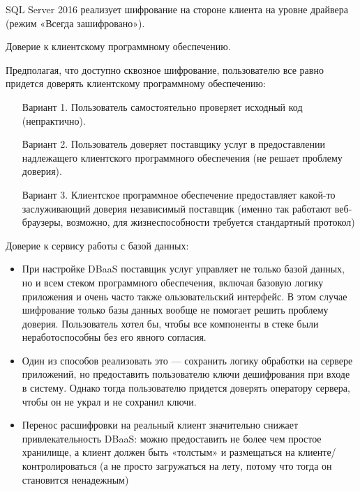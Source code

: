 SQL Server 2016 реализует шифрование на стороне клиента на уровне драйвера (режим «Всегда
зашифровано»).

Доверие к клиентскому программному обеспечению.

Предполагая, что доступно сквозное шифрование, пользователю все равно придется доверять
клиентскому программному обеспечению:
\begin{itemize}
    \item[Вариант 1.] Пользователь самостоятельно проверяет исходный код (непрактично).
    \item[Вариант 2.] Пользователь доверяет поставщику услуг в предоставлении надлежащего
        клиентского программного обеспечения (не решает проблему доверия).
    \item[Вариант 3.] Клиентское программное обеспечение предоставляет какой-то заслуживающий
        доверия независимый поставщик (именно так работают веб-браузеры, возможно, для
        жизнеспособности требуется стандартный протокол)
\end{itemize}

Доверие к сервису работы с базой данных:
\begin{itemize}
    \item При настройке DBaaS поставщик услуг управляет не только базой данных, но и всем стеком
        программного обеспечения, включая базовую логику приложения и очень часто также
        ользовательский интерфейс. В этом случае шифрование только базы данных вообще не помогает
        решить проблему доверия. Пользователь хотел бы, чтобы все компоненты в стеке были
        неработоспособны без его явного согласия.
    \item Один из способов реализовать это — сохранить логику обработки на сервере приложений, но
        предоставить пользователю ключи дешифрования при входе в систему. Однако тогда пользователю
        придется доверять оператору сервера, чтобы он не украл и не сохранил ключи.
    \item Перенос расшифровки на реальный клиент значительно снижает привлекательность DBaaS: можно
        предоставить не более чем простое хранилище, а клиент должен быть «толстым» и размещаться на
        клиенте/контролироваться (а не просто загружаться на лету, потому что тогда он становится
        ненадежным)
\end{itemize}

